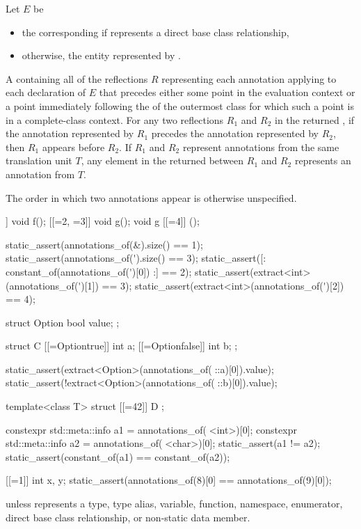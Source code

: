 \begin{itemdescr}
\pnum
Let $E$ be
\begin{itemize}
\item
  the corresponding 
  if  represents a direct base class relationship,
\item
  otherwise, the entity represented by .
\end{itemize}

\pnum
\returns
A  containing all of the reflections $R$
representing each annotation applying to each declaration of $E$ that precedes either
some point in the evaluation context or
a point immediately following the 
of the outermost class for which such a point is in a complete-class context.
For any two reflections $R_1$ and $R_2$ in the returned ,
if the annotation represented by $R_1$ precedes the annotation represented by $R_2$,
then $R_1$ appears before $R_2$.
If $R_1$ and $R_2$ represent annotations from the same translation unit $T$,
any element in the returned  between $R_1$ and $R_2$
represents an annotation from $T$.
\begin{note}
The order in which two annotations appear is otherwise unspecified.
\end{note}
\begin{example}
\begin{codeblock}
[[=1]] void f();
[[=2, =3]] void g();
void g [[=4]] ();

static_assert(annotations_of(^^f).size() == 1);
static_assert(annotations_of(^^g).size() == 3);
static_assert([: constant_of(annotations_of(^^g)[0]) :] == 2);
static_assert(extract<int>(annotations_of(^^g)[1]) == 3);
static_assert(extract<int>(annotations_of(^^g)[2]) == 4);

struct Option { bool value; };

struct C {
  [[=Option{true}]] int a;
  [[=Option{false}]] int b;
};

static_assert(extract<Option>(annotations_of(^^C::a)[0]).value);
static_assert(!extract<Option>(annotations_of(^^C::b)[0]).value);

template<class T>
  struct [[=42]] D { };

constexpr std::meta::info a1 = annotations_of(^^D<int>)[0];
constexpr std::meta::info a2 = annotations_of(^^D<char>)[0];
static_assert(a1 != a2);
static_assert(constant_of(a1) == constant_of(a2));

[[=1]] int x, y;
static_assert(annotations_of(^^x)[0] == annotations_of(^^y)[0]);
\end{codeblock}
\end{example}

\pnum
\throws
{} unless
 represents a
type,
type alias,
variable,
function,
namespace,
enumerator,
direct base class relationship, or
non-static data member.
\end{itemdescr}

